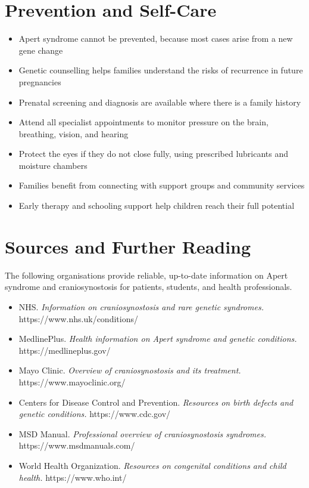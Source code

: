\section*{Prevention and Self-Care}
\begin{itemize}
    \item Apert syndrome cannot be prevented, because most cases arise from a new gene change
    \item Genetic counselling helps families understand the risks of recurrence in future pregnancies
    \item Prenatal screening and diagnosis are available where there is a family history
    \item Attend all specialist appointments to monitor pressure on the brain, breathing, vision, and hearing
    \item Protect the eyes if they do not close fully, using prescribed lubricants and moisture chambers
    \item Families benefit from connecting with support groups and community services
    \item Early therapy and schooling support help children reach their full potential
\end{itemize}

\section*{Sources and Further Reading}
The following organisations provide reliable, up-to-date information on Apert syndrome and craniosynostosis for patients, students, and health professionals.

\begin{itemize}
    \item NHS. \textit{Information on craniosynostosis and rare genetic syndromes.} https://www.nhs.uk/conditions/
    \item MedlinePlus. \textit{Health information on Apert syndrome and genetic conditions.} https://medlineplus.gov/
    \item Mayo Clinic. \textit{Overview of craniosynostosis and its treatment.} https://www.mayoclinic.org/
    \item Centers for Disease Control and Prevention. \textit{Resources on birth defects and genetic conditions.} https://www.cdc.gov/
    \item MSD Manual. \textit{Professional overview of craniosynostosis syndromes.} https://www.msdmanuals.com/
    \item World Health Organization. \textit{Resources on congenital conditions and child health.} https://www.who.int/
\end{itemize}

